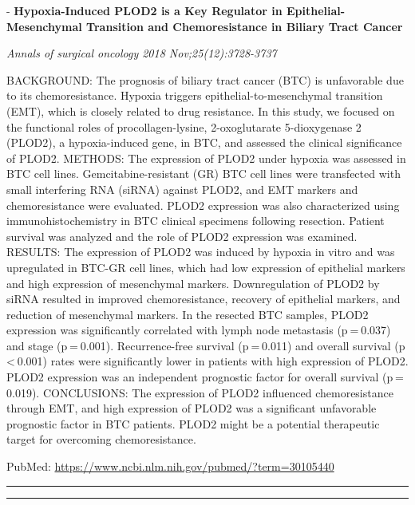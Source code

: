 \documentclass[]{article}
\begin{document}
 - \textbf{Hypoxia-Induced PLOD2 is a Key Regulator in
Epithelial-Mesenchymal Transition and Chemoresistance in Biliary Tract
Cancer}

\emph{Annals of surgical oncology 2018 Nov;25(12):3728-3737}

BACKGROUND: The prognosis of biliary tract cancer (BTC) is unfavorable
due to its chemoresistance. Hypoxia triggers epithelial-to-mesenchymal
transition (EMT), which is closely related to drug resistance. In this
study, we focused on the functional roles of procollagen-lysine,
2-oxoglutarate 5-dioxygenase 2 (PLOD2), a hypoxia-induced gene, in BTC,
and assessed the clinical significance of PLOD2. METHODS: The expression
of PLOD2 under hypoxia was assessed in BTC cell lines.
Gemcitabine-resistant (GR) BTC cell lines were transfected with small
interfering RNA (siRNA) against PLOD2, and EMT markers and
chemoresistance were evaluated. PLOD2 expression was also characterized
using immunohistochemistry in BTC clinical specimens following
resection. Patient survival was analyzed and the role of PLOD2
expression was examined. RESULTS: The expression of PLOD2 was induced by
hypoxia in vitro and was upregulated in BTC-GR cell lines, which had low
expression of epithelial markers and high expression of mesenchymal
markers. Downregulation of PLOD2 by siRNA resulted in improved
chemoresistance, recovery of epithelial markers, and reduction of
mesenchymal markers. In the resected BTC samples, PLOD2 expression was
significantly correlated with lymph node metastasis (p = 0.037) and
stage (p = 0.001). Recurrence-free survival (p = 0.011) and overall
survival (p \textless{} 0.001) rates were significantly lower in
patients with high expression of PLOD2. PLOD2 expression was an
independent prognostic factor for overall survival (p = 0.019).
CONCLUSIONS: The expression of PLOD2 influenced chemoresistance through
EMT, and high expression of PLOD2 was a significant unfavorable
prognostic factor in BTC patients. PLOD2 might be a potential
therapeutic target for overcoming chemoresistance.

PubMed: \url{https://www.ncbi.nlm.nih.gov/pubmed/?term=30105440}

{}

{}

\begin{center}\rule{0.5\linewidth}{\linethickness}\end{center}

\begin{center}\rule{0.5\linewidth}{\linethickness}\end{center}
\end{document}
